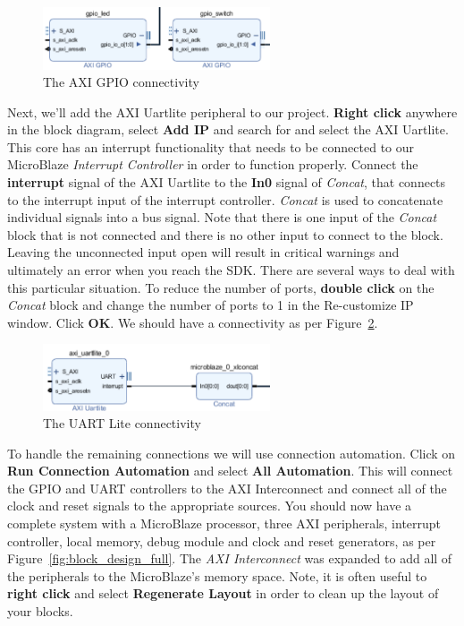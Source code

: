 \documentclass[11pt]{article}
\begin{document}
\begin{figure}[h]
    \centering
    \includegraphics[width=0.6\textwidth]{images/gpio_connect.png}
    \caption{The AXI GPIO connectivity}
    \label{fig:gpio_connect}
\end{figure}

Next, we'll add the AXI Uartlite peripheral to our project. \textbf{Right click} anywhere in the block diagram, select \textbf{Add IP} and search for and select the AXI Uartlite. This core has an interrupt functionality that needs to be connected to our MicroBlaze \textit{Interrupt Controller} in order to function properly. Connect the \textbf{interrupt} signal of the AXI Uartlite to the \textbf{In0} signal of \textit{Concat}, that connects to the interrupt input of the interrupt controller. \textit{Concat} is used to concatenate individual signals into a bus signal. Note that there is one input of the \textit{Concat} block that is not connected and there is no other input to connect to the block. Leaving the unconnected input open will result in critical warnings and ultimately an error when you reach the SDK. There are several ways to deal with this particular situation. To reduce the number of ports, \textbf{double click} on the \textit{Concat} block and
change the number of ports to 1 in the Re-customize IP window. Click \textbf{OK}. We should have a connectivity as per Figure~\ref{fig:uart_connect}.

\begin{figure}[h]
    \centering
    \includegraphics[width=0.6\textwidth]{images/uart_connect.png}
    \caption{The UART Lite connectivity}
    \label{fig:uart_connect}
\end{figure}

To handle the remaining connections we will use connection automation. Click on \textbf{Run Connection Automation} and select
\textbf{All Automation}. This will connect the GPIO and UART controllers to the AXI Interconnect and connect all of the clock and reset signals to the appropriate sources. You should now have a complete system with a MicroBlaze processor, three AXI peripherals, interrupt controller, local memory, debug module and clock and reset generators, as per Figure~\ref{fig:block_design_full}. The \textit{AXI Interconnect} was expanded to add all of the peripherals to the MicroBlaze's memory space. Note, it is often useful to \textbf{right click} and select \textbf{Regenerate Layout} in order to clean up the layout of your blocks.
\end{document}
